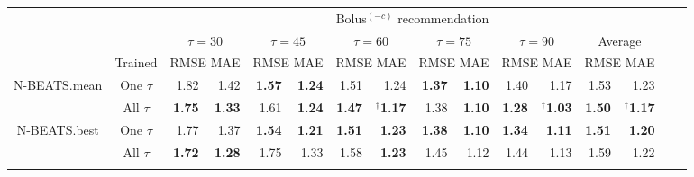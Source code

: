 \begin{table}[ht]
\begin{center}
\begin{tabular}{|c|c|rr|rr|rr|rr|rr|rr|rr}
    \cline{3-14}
    \multicolumn{2}{c|}{} & \multicolumn{12}{c|}{Bolus$^{(-c)}$ recommendation}\\
    \cline{3-14}
    \multicolumn{2}{c|}{} & \multicolumn{2}{c|}{$\tau=30$} & \multicolumn{2}{c|}{$\tau=45$} & \multicolumn{2}{c|}{$\tau=60$} & \multicolumn{2}{c|}{$\tau=75$} & \multicolumn{2}{c|}{$\tau=90$} & \multicolumn{2}{c|}{Average}\\
    \cline{2-14}
     \multicolumn{1}{c|}{}& Trained & \multicolumn{2}{c|}{\scriptsize RMSE MAE} & \multicolumn{2}{c|}{\scriptsize RMSE MAE} & \multicolumn{2}{c|}{\scriptsize RMSE MAE} & \multicolumn{2}{c|}{\scriptsize RMSE MAE} & \multicolumn{2}{c|}{\scriptsize RMSE MAE} & \multicolumn{2}{c|}{\scriptsize RMSE MAE} \\
    \hline
    \multirow{2}{*}{N-BEATS.mean} & One $\tau$ & 1.82 & 1.42 & {\bf 1.57} & {\bf 1.24} & 1.51 & 1.24 & {\bf 1.37} & {\bf 1.10} & 1.40 & 1.17 & 1.53 & 1.23\\
    & All $\tau$ & {\bf 1.75} & {\bf 1.33} & 1.61 & {\bf 1.24} & {\bf 1.47} & $^\dagger${\bf 1.17} & 1.38 & {\bf 1.10} & {\bf 1.28} & $^\dagger${\bf 1.03} & {\bf 1.50} & $^\dagger${\bf 1.17}\\
    \hline
    \multirow{2}{*}{N-BEATS.best} & One $\tau$ & 1.77 & 1.37 & {\bf 1.54} & {\bf 1.21} & {\bf 1.51} & {\bf 1.23} & {\bf 1.38} & {\bf 1.10} & {\bf 1.34} & {\bf 1.11} & {\bf 1.51} & {\bf 1.20}\\
    & All $\tau$ & {\bf 1.72} & {\bf 1.28} & 1.75 & 1.33 & 1.58 & {\bf 1.23} & 1.45 & 1.12 & 1.44 & 1.13 & 1.59 & 1.22\\
    \hline
    
    \multicolumn{14}{c}{}\\[-1.5ex]


\end{tabular}
\end{center}
\end{table}
